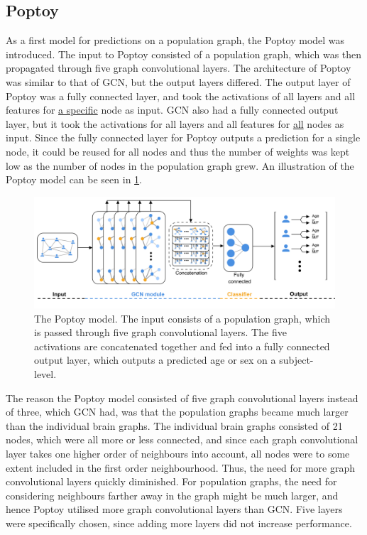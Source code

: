 \subsection{Poptoy}

As a first model for predictions on a population graph, the Poptoy model was introduced. The input to Poptoy consisted of a population graph, which was then propagated through five graph convolutional layers. The architecture of Poptoy was similar to that of GCN, but the output layers differed. The output layer of Poptoy was a fully connected layer, and took the activations of all layers and all features for \underline{a specific} node as input. GCN also had a fully connected output layer, but it took the activations for all layers and all features for \underline{all} nodes as input. Since the fully connected layer for Poptoy outputs a prediction for a single node, it could be reused for all nodes and thus the number of weights was kept low as the number of nodes in the population graph grew. An illustration of the Poptoy model can be seen in \cref{fig:poptoy}.

\begin{figure}[!htbp]
    \centering
    \includegraphics[width=\textwidth]{chapters/images_methods/poptoy_v2.png}
    \caption{The Poptoy model. The input consists of a population graph, which is passed through five graph convolutional layers. The five activations are concatenated together and fed into a fully connected output layer, which outputs a predicted age or sex on a subject-level.}
    \label{fig:poptoy}
\end{figure}

The reason the Poptoy model consisted of five graph convolutional layers instead of three, which GCN had, was that the population graphs became much larger than the individual brain graphs. The individual brain graphs consisted of 21 nodes, which were all more or less connected, and since each graph convolutional layer takes one higher order of neighbours into account, all nodes were to some extent included in the first order neighbourhood. Thus, the need for more graph convolutional layers quickly diminished. For population graphs, the need for considering neighbours farther away in the graph might be much larger, and hence Poptoy utilised more graph convolutional layers than GCN. Five layers were specifically chosen, since adding more layers did not increase performance.

